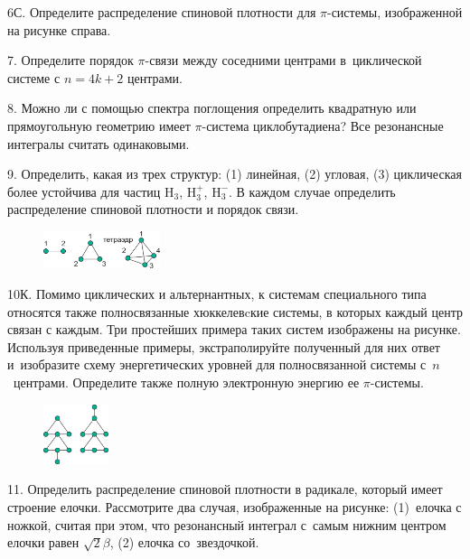 6С. Определите распределение спиновой плотности для $\pi$-системы, изображенной на рисунке справа. 
\par
7. Определите порядок $\pi$-связи между соседними центрами в~циклической системе с $n= 4k + 2$ центрами.
\par
8. Можно ли с помощью спектра поглощения определить квадратную или прямоугольную геометрию имеет $\pi$-система циклобутадиена? Все резонансные интегралы считать одинаковыми.
\par
9. Определить, какая из трех структур: (1) линейная, (2) угловая, (3) циклическая более устойчива для частиц $\text{H}_3$, $\text{H}_3^+$, $\text{H}_3^-$. В каждом случае определить распределение спиновой плотности и порядок связи.
\par
\begin{figure} %
    \centering
    \vspace{2mm}
    \includegraphics[width=34mm]{images/Fig_1_8_11.png}
    \vspace{-1mm}
\end{figure}
10К. Помимо циклических и альтернантных, к системам специального типа относятся также полносвязанные хюккелевcкие системы, в которых каждый центр связан с каждым. Три простейших примера таких систем изображены на рисунке. Используя приведенные примеры, экстраполируйте полученный для них ответ и~изобразите схему энергетических уровней для полносвязанной системы с~$n$~центрами. Определите также полную электронную энергию ее $\pi$-системы.
\par
\begin{figure} %
    \centering
    \vspace{-7.4ex}
    \includegraphics[width=19mm]{images/Fig_1_8_9.png}
    \vspace{-3ex}
\end{figure}
11. Определить распределение спиновой плотности в радикале, который имеет строение елочки. Рассмотрите два случая, изображенные на рисунке: (1)~елочка с ножкой, считая при этом, что резонансный интеграл с~самым нижним центром елочки равен $\sqrt{2}\beta$, (2) елочка со~звездочкой.
\par